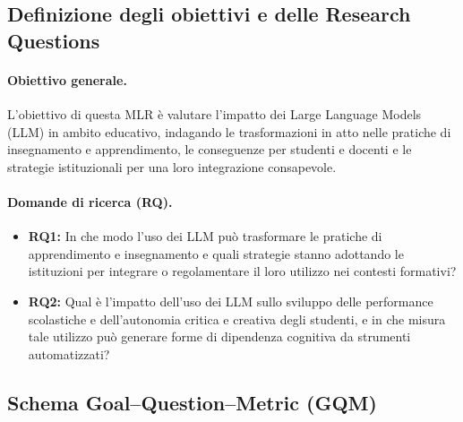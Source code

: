 \documentclass[a4paper,9pt]{article}
\begin{document}
	\subsection{ Definizione degli obiettivi e delle Research Questions}
	
	\paragraph{Obiettivo generale.}
	L’obiettivo di questa MLR è valutare l’impatto dei Large Language Models (LLM) in ambito educativo, indagando le trasformazioni in atto nelle pratiche di insegnamento e apprendimento, le conseguenze per studenti e docenti e le strategie istituzionali per una loro integrazione consapevole.
	
	\paragraph{Domande di ricerca (RQ).}
	\begin{itemize}
		\item \textbf{RQ1:} In che modo l’uso dei LLM  può trasformare le pratiche di apprendimento e insegnamento e quali strategie stanno adottando le istituzioni per integrare o regolamentare il loro utilizzo nei contesti formativi?
		\item \textbf{RQ2:} Qual è l’impatto dell’uso dei LLM sullo sviluppo delle performance scolastiche e dell’autonomia critica e creativa degli studenti, e in che misura tale utilizzo può generare forme di dipendenza cognitiva da strumenti automatizzati?


	\end{itemize}
		
	\subsection{ Schema Goal–Question–Metric (GQM)}
\end{document}
